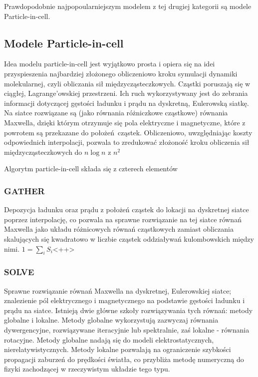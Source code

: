 Prawdopodobnie najpopoularniejszym modelem z tej drugiej kategorii są modele Particle-in-cell.

\subsection{Modele Particle-in-cell}

Idea modelu particle-in-cell jest wyjątkowo prosta i opiera się na idei przyspieszenia najbardziej złożonego obliczeniowo kroku
symulacji dynamiki molekularnej, czyli obliczania sił międzycząsteczkowych. Cząstki poruszają się w ciągłej, Lagrange'owskiej przestrzeni.
Ich ruch wykorzystywany jest do zebrania informacji dotyczącej gęstości ładunku i prądu na dyskretną, Eulerowską siatkę. Na siatce rozwiązane
są (jako równania różniczkowe cząstkowe) równania Maxwella, dzięki którym otrzymuje się pola elektryczne i magnetyczne, które z powrotem są przekazane
do położeń cząstek. Obliczeniowo, uwzględniając koszty odpowiednich interpolacji, pozwala to zredukować złożoność kroku obliczenia sił międzycząsteczkowych
do $n \log{n}$ z $n^2$ %

Algorytm particle-in-cell składa się z czterech elementów %
\subsubsection{GATHER}
    Depozycja ładunku oraz prądu z położeń cząstek do lokacji na dyskretnej siatce poprzez interpolację,
    co pozwala na sprawne rozwiązanie na tej siatce
    równań Maxwella jako układu różnicowych równań cząstkowych zamiast obliczania skalujących się kwadratowo w liczbie cząstek
    oddziaływań kulombowskich między nimi.
    $1 = \sum_i S_i$<++> %
\subsubsection{SOLVE}
    Sprawne rozwiązanie równań Maxwella na dyskretnej, Eulerowskiej siatce;
    znalezienie pól elektrycznego i magnetycznego
    na podstawie gęstości ładunku i prądu na siatce.
    Istnieją dwie główne szkoły rozwiązywania tych równań: metody globalne i lokalne. Metody globalne wykorzystują
    zazwyczaj równania dywergencyjne, rozwiązywane iteracyjnie lub spektralnie,
    zaś lokalne - równania rotacyjne. Metody globalne nadają się do modeli elektrostatycznych, nierelatywistycznych.
    Metody lokalne pozwalają na ograniczenie szybkości propagacji zaburzeń do prędkości światła, co przybliża
    metodę numeryczną do fizyki zachodzącej w rzeczywistym układzie tego typu.
